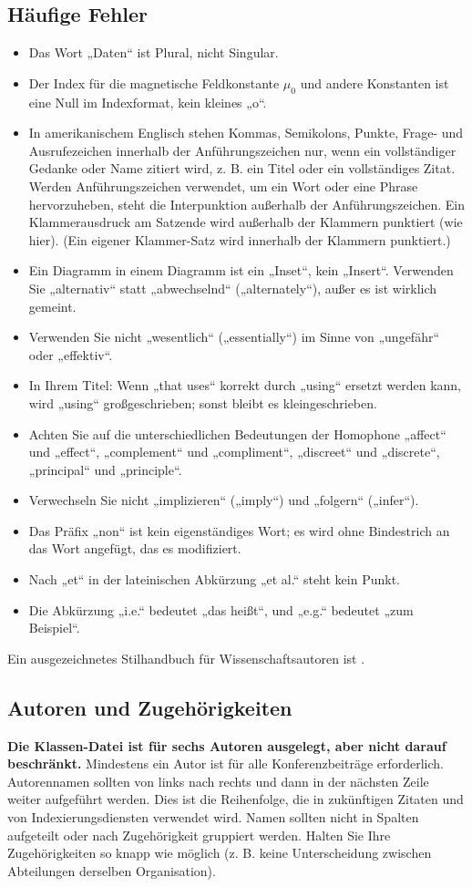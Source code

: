 \documentclass[conference]{IEEEtran}
\begin{document}
\subsection{Häufige Fehler}\label{SCM}
\begin{itemize}
\item Das Wort „Daten“ ist Plural, nicht Singular.
\item Der Index für die magnetische Feldkonstante $\mu_{0}$ und andere Konstanten ist eine Null im Indexformat, kein kleines „o“.
\item In amerikanischem Englisch stehen Kommas, Semikolons, Punkte, Frage- und Ausrufezeichen innerhalb der Anführungszeichen nur, wenn ein vollständiger Gedanke oder Name zitiert wird, z. B. ein Titel oder ein vollständiges Zitat. Werden Anführungszeichen verwendet, um ein Wort oder eine Phrase hervorzuheben, steht die Interpunktion außerhalb der Anführungszeichen. Ein Klammerausdruck am Satzende wird außerhalb der Klammern punktiert (wie hier). (Ein eigener Klammer-Satz wird innerhalb der Klammern punktiert.)
\item Ein Diagramm in einem Diagramm ist ein „Inset“, kein „Insert“. Verwenden Sie „alternativ“ statt „abwechselnd“ („alternately“), außer es ist wirklich gemeint.
\item Verwenden Sie nicht „wesentlich“ („essentially“) im Sinne von „ungefähr“ oder „effektiv“.
\item In Ihrem Titel: Wenn „that uses“ korrekt durch „using“ ersetzt werden kann, wird „using“ großgeschrieben; sonst bleibt es kleingeschrieben.
\item Achten Sie auf die unterschiedlichen Bedeutungen der Homophone „affect“ und „effect“, „complement“ und „compliment“, „discreet“ und „discrete“, „principal“ und „principle“.
\item Verwechseln Sie nicht „implizieren“ („imply“) und „folgern“ („infer“).
\item Das Präfix „non“ ist kein eigenständiges Wort; es wird ohne Bindestrich an das Wort angefügt, das es modifiziert.
\item Nach „et“ in der lateinischen Abkürzung „et al.“ steht kein Punkt.
\item Die Abkürzung „i.e.“ bedeutet „das heißt“, und „e.g.“ bedeutet „zum Beispiel“.
\end{itemize}
Ein ausgezeichnetes Stilhandbuch für Wissenschaftsautoren ist \cite{b7}.

\subsection{Autoren und Zugehörigkeiten}
\textbf{Die Klassen-Datei ist für sechs Autoren ausgelegt, aber nicht darauf beschränkt.} Mindestens ein Autor ist für alle Konferenzbeiträge erforderlich. Autorennamen
sollten von links nach rechts und dann in der nächsten Zeile weiter aufgeführt werden.
Dies ist die Reihenfolge, die in zukünftigen Zitaten
und von Indexierungsdiensten verwendet wird. Namen sollten nicht in Spalten aufgeteilt oder nach Zugehörigkeit gruppiert werden. Halten Sie Ihre Zugehörigkeiten so knapp wie möglich (z. B. keine Unterscheidung zwischen Abteilungen derselben Organisation).
\end{document}
